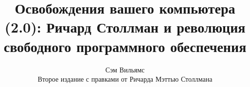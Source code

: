 \documentclass[10pt]{book}
\begin{document}
\title{Освобождения вашего компьютера (2.0): Ричард Столлман и революция свободного программного обеспечения}
\author{Сэм Вильямс \\ Второе издание с правками от Ричарда Мэттью Столлмана}
\date{}

\maketitle
\thispagestyle{empty}
\frontmatter

\thispagestyle{empty}
\tableofcontents



\mainmatter














\backmatter



\printindex

\end{document}
